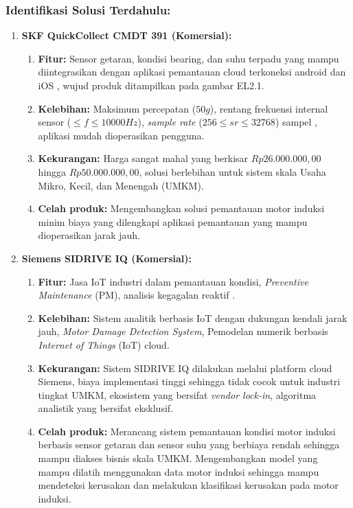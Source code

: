 \documentclass{elsinta}
\begin{document}
\subsubsection*{Identifikasi Solusi Terdahulu:}
\begin{enumerate}
    \item \textbf{SKF QuickCollect CMDT 391 (Komersial):}
    \begin{enumerate}
        \item \textbf{Fitur:} Sensor getaran, kondisi bearing, dan suhu terpadu yang mampu diintegrasikan dengan aplikasi pemantauan cloud terkoneksi android dan iOS \cite{2.1.1}, wujud produk ditampilkan pada gambar EL2.1.
        \item \textbf{Kelebihan:} Maksimum percepatan ($50g$), rentang frekuensi internal sensor ($\leq f \leq 10000Hz$), \textit{sample rate} ($256\leq sr \leq 32768$) sampel \cite{skf_datasheet}, aplikasi mudah dioperasikan pengguna.
        \item \textbf{Kekurangan:} Harga sangat mahal yang berkisar $Rp26.000.000,00$ hingga $Rp50.000.000,00$, solusi berlebihan untuk sistem skala Usaha Mikro, Kecil, dan Menengah (UMKM).
        \item \textbf{Celah produk:} Mengembangkan solusi pemantauan motor induksi minim biaya yang dilengkapi aplikasi pemantauan yang mampu dioperasikan jarak jauh.
    \end{enumerate}
    \item \textbf{Siemens SIDRIVE IQ (Komersial):}
    \begin{enumerate}
        \item \textbf{Fitur:} Jasa IoT industri dalam pemantauan kondisi, \textit{Preventive Maintenance} (PM), analisis kegagalan reaktif \cite{2.1.2}.
        \item \textbf{Kelebihan:} Sistem analitik berbasis IoT dengan dukungan kendali jarak jauh, \textit{Motor Damage Detection System}, Pemodelan numerik berbasis \textit{Internet of Things} (IoT) cloud\cite{2.1.2}.
        \item \textbf{Kekurangan:} Sistem SIDRIVE IQ dilakukan melalui platform cloud Siemens, biaya implementasi tinggi sehingga tidak cocok untuk industri tingkat UMKM, ekosistem yang bersifat \textit{vendor lock-in}, algoritma analistik yang bersifat eksklusif.
        \item \textbf{Celah produk:} Merancang sistem pemantauan kondisi motor induksi berbasis sensor getaran dan sensor suhu yang berbiaya rendah sehingga mampu diakses bisnis skala UMKM. Mengembangkan model yang mampu dilatih menggunakan data motor induksi sehingga mampu mendeteksi kerusakan dan melakukan klasifikasi kerusakan pada motor induksi.
    \end{enumerate}
\end{enumerate}
 
\end{document}
